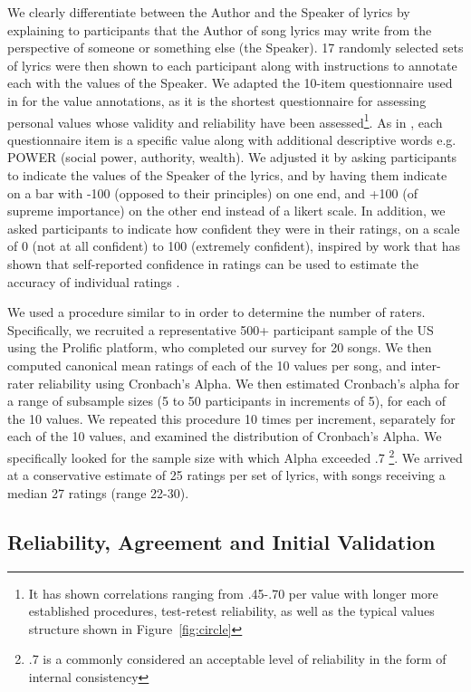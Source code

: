 \documentclass{article}
\begin{document}
We clearly differentiate between the Author and the Speaker of lyrics by explaining to participants that the Author of song lyrics may write from the perspective of someone or something else (the Speaker). 17 randomly selected sets of lyrics were then shown to each participant along with instructions to annotate each with the values of the Speaker. We adapted the 10-item questionnaire used in \cite{lindeman2005measuring} for the value annotations, as it is the shortest questionnaire for assessing personal values whose validity and reliability have been assessed\footnote{It has shown correlations ranging from .45-.70 per value with longer more established procedures, test-retest reliability, as well as the typical values structure shown in Figure~\ref{fig:circle}}. As in \cite{lindeman2005measuring}, each questionnaire item is a specific value along with additional descriptive words e.g. POWER (social power, authority, wealth). We adjusted it by asking participants to indicate the values of the Speaker of the lyrics, and by having them indicate on a bar with -100 (opposed to their principles) on one end, and +100 (of supreme importance) on the other end instead of a likert scale. In addition, we asked participants to indicate how confident they were in their ratings, on a scale of 0 (not at all confident) to 100 (extremely confident), inspired by work that has shown that self-reported confidence in ratings can be used to estimate the accuracy of individual ratings \cite{cabitza2020if}. 

We used a procedure similar to \cite{DeBruine_Jones_2018} in order to determine the number of raters. Specifically, we recruited a representative 500+ participant sample of the US using the Prolific platform, who completed our survey for 20 songs. We then computed canonical mean ratings of each of the 10 values per song, and inter-rater reliability using Cronbach's Alpha. We then estimated Cronbach’s alpha for a range of subsample sizes (5 to 50 participants in increments of 5), for each of the 10 values. We repeated this procedure 10 times per increment, separately for each of the 10 values, and examined the distribution of Cronbach’s Alpha. We specifically looked for the sample size with which Alpha exceeded .7 \footnote{.7 is a commonly considered an acceptable level of reliability in the form of internal consistency}. We arrived at a conservative estimate of 25 ratings per set of lyrics, with songs receiving a median 27 ratings (range 22-30). 

\subsection{Reliability, Agreement and Initial Validation}
\end{document}
